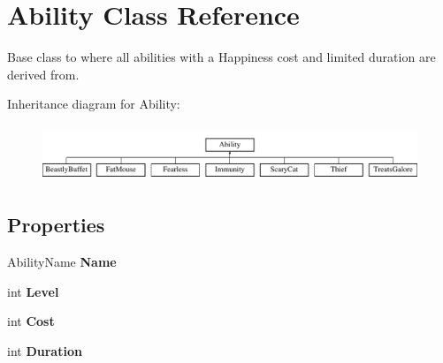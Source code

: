 \hypertarget{class_ability}{}\section{Ability Class Reference}
\label{class_ability}


Base class to where all abilities with a Happiness cost and limited duration are derived from.  


Inheritance diagram for Ability\+:\begin{figure}[H]
\begin{center}
\leavevmode
\includegraphics[height=1.702128cm]{class_ability}
\end{center}
\end{figure}
\subsection*{Properties}
\begin{DoxyCompactItemize}
\item 
Ability\+Name {\bfseries Name}\hypertarget{class_ability_a7d67b154e83cae1c52d821cac6f81abe}{}\label{class_ability_a7d67b154e83cae1c52d821cac6f81abe}

\item 
int {\bfseries Level}\hypertarget{class_ability_a4ca153df49091be7325904960f49b810}{}\label{class_ability_a4ca153df49091be7325904960f49b810}

\item 
int {\bfseries Cost}\hypertarget{class_ability_ae2d8aec43091f7b83e366137d43135ef}{}\label{class_ability_ae2d8aec43091f7b83e366137d43135ef}

\item 
int {\bfseries Duration}\hypertarget{class_ability_a5bfb4991a7a4cf857e10f3a33cdd3925}{}\label{class_ability_a5bfb4991a7a4cf857e10f3a33cdd3925}

\end{DoxyCompactItemize}


